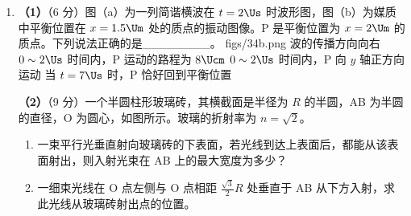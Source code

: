 \documentclass[\gkver]{gaokaozhenti}
\begin{document}
\begin{enumerate}
{（2）设气缸的横截面积为 $S$，沙子倒在活塞上后，对气体产生的压强为 $\Delta p$，由玻意耳定律得

$phS=(p+\Delta p)(h-\frac{1}{4}h)S$ ①

解得 $\Delta p=\frac{1}{3}p$ ②

外界的温度变为 $T$ 后，设活塞距底面的高度为 $h'$。根据盖—吕萨克定律，得

$\frac{(h-\frac{1}{4}h)S}{T_{0}}=\frac{h'S}{T}$ ③

解得 $h'=\frac{3T}{4T_{0}}h$ ④

据题意可得 $\Delta p=\frac{mg}{S}$ ⑤

气体最后的体积为 $V=Sh'$ ⑥

联立②④⑤⑥式得

$V=\frac{9mghT}{4pT_{0}}$ ⑦
}

\item
\textbf{（1）}（6 分）图（a）为一列简谐横波在 $t=2\Us$ 时波形图，图（b）为媒质中平衡位置在 $x=1.5\Um$ 处的质点的振动图像。P 是平衡位置为 $x=2\Um$ 的质点。下列说法正确的是\_\_\_\_\_\_\_\_。
{figs/34b.png}
{波的传播方向向右}
{$0\sim2\Us$ 时间内，P 运动的路程为 $8\Ucm$}
{$0\sim2\Us$ 时间内，P 向 $y$ 轴正方向运动}
{当 $t=7\Us$ 时，P 恰好回到平衡位置}

\textbf{（2）}（9 分）一个半圆柱形玻璃砖，其横截面是半径为 $R$ 的半圆，AB 为半圆的直径，O 为圆心，如图所示。玻璃的折射率为 $n=\sqrt 2 $。
\begin{enumerate}
	\item
	一束平行光垂直射向玻璃砖的下表面，若光线到达上表面后，都能从该表面射出，则入射光束在 AB 上的最大宽度为多少？
	\item
	一细束光线在 O 点左侧与 O 点相距 $\frac{\sqrt 3}{2}R$ 处垂直于 AB 从下方入射，求此光线从玻璃砖射出点的位置。
\end{enumerate}
\end{enumerate}
\end{document}
